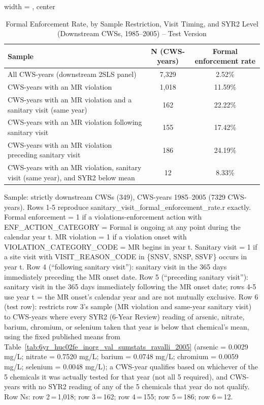 \begin{table}[htbp]
\caption{\label{tab:sanitary_visit_formal_enforcement_rate_syr2_below_mean} Formal Enforcement Rate, by Sample Restriction, Visit Timing, and SYR2 Level (Downstream CWSs, 1985--2005) -- Test Version}
\bigskip
\centering
\begin{adjustbox}{width = \textwidth, center}
\begin{tabular}{lcc}
\toprule
Sample & N (CWS-years) & Formal enforcement rate \\
\midrule
All CWS-years (downstream 2SLS panel) & 7{,}329 & 2.52\% \\
CWS-years with an MR violation & 1{,}018 & 11.59\% \\
CWS-years with an MR violation and a sanitary visit (same year) & 162 & 22.22\% \\
CWS-years with an MR violation following sanitary visit & 155 & 17.42\% \\
CWS-years with an MR violation preceding sanitary visit & 186 & 24.19\% \\
CWS-years with an MR violation, sanitary visit (same year), and SYR2 below mean & 12 & 8.33\% \\
\bottomrule
\end{tabular}
\end{adjustbox}
{\tiny\linespread{1}\selectfont \par \raggedright 
Sample: strictly downstream CWSs (349), CWS-years 1985--2005 (7329 CWS-years). Rows 1-5 reproduce sanitary\_visit\_formal\_enforcement\_rate.r exactly. Formal enforcement = 1 if a violations-enforcement action with ENF\_ACTION\_CATEGORY = Formal is ongoing at any point during the calendar year t. MR violation = 1 if a violation onset with VIOLATION\_CATEGORY\_CODE = MR begins in year t. Sanitary visit = 1 if a site visit with VISIT\_REASON\_CODE in \{SNSV, SNSP, SSVF\} occurs in year t. Row 4 (``following sanitary visit''): sanitary visit in the 365 days immediately preceding the MR onset date. Row 5 (``preceding sanitary visit''): sanitary visit in the 365 days immediately following the MR onset date; rows 4-5 use year t = the MR onset's calendar year and are not mutually exclusive. Row 6 (test row): restricts row 3's sample (MR violation and same-year sanitary visit) to CWS-years where every SYR2 (6-Year Review) reading of arsenic, nitrate, barium, chromium, or selenium taken that year is below that chemical's mean, using the fixed published means from Table~\ref{tab:6yr_huc02fe_inorg_val_sumstats_ravalli_2005} (arsenic = 0.0029 mg/L; nitrate = 0.7520 mg/L; barium = 0.0748 mg/L; chromium = 0.0059 mg/L; selenium = 0.0048 mg/L); a CWS-year qualifies based on whichever of the 5 chemicals it was actually tested for that year (not all 5 required), and CWS-years with no SYR2 reading of any of the 5 chemicals that year do not qualify. Row Ns: row 2\,=\,1{,}018; row 3\,=\,162; row 4\,=\,155; row 5\,=\,186; row 6\,=\,12.
}
\end{table}
